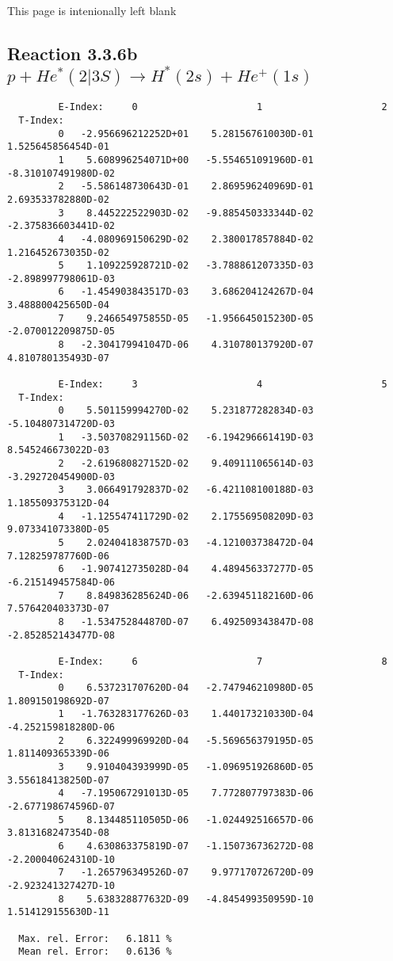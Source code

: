 \documentclass[12pt]{article}
\begin{document}
\newpage
This page is intenionally left blank
\newpage

\subsection{
Reaction 3.3.6b  $  p + He^*(2|3S) \rightarrow H^*(2s) + He^+(1s)$
}


\begin{small}\begin{verbatim}
         E-Index:     0                     1                     2
  T-Index:
         0   -2.956696212252D+01    5.281567610030D-01    1.525645856454D-01
         1    5.608996254071D+00   -5.554651091960D-01   -8.310107491980D-02
         2   -5.586148730643D-01    2.869596240969D-01    2.693533782880D-02
         3    8.445222522903D-02   -9.885450333344D-02   -2.375836603441D-02
         4   -4.080969150629D-02    2.380017857884D-02    1.216452673035D-02
         5    1.109225928721D-02   -3.788861207335D-03   -2.898997798061D-03
         6   -1.454903843517D-03    3.686204124267D-04    3.488800425650D-04
         7    9.246654975855D-05   -1.956645015230D-05   -2.070012209875D-05
         8   -2.304179941047D-06    4.310780137920D-07    4.810780135493D-07

         E-Index:     3                     4                     5
  T-Index:
         0    5.501159994270D-02    5.231877282834D-03   -5.104807314720D-03
         1   -3.503708291156D-02   -6.194296661419D-03    8.545246673022D-03
         2   -2.619680827152D-02    9.409111065614D-03   -3.292720454900D-03
         3    3.066491792837D-02   -6.421108100188D-03    1.185509375312D-04
         4   -1.125547411729D-02    2.175569508209D-03    9.073341073380D-05
         5    2.024041838757D-03   -4.121003738472D-04    7.128259787760D-06
         6   -1.907412735028D-04    4.489456337277D-05   -6.215149457584D-06
         7    8.849836285624D-06   -2.639451182160D-06    7.576420403373D-07
         8   -1.534752844870D-07    6.492509343847D-08   -2.852852143477D-08

         E-Index:     6                     7                     8
  T-Index:
         0    6.537231707620D-04   -2.747946210980D-05    1.809150198692D-07
         1   -1.763283177626D-03    1.440173210330D-04   -4.252159818280D-06
         2    6.322499969920D-04   -5.569656379195D-05    1.811409365339D-06
         3    9.910404393999D-05   -1.096951926860D-05    3.556184138250D-07
         4   -7.195067291013D-05    7.772807797383D-06   -2.677198674596D-07
         5    8.134485110505D-06   -1.024492516657D-06    3.813168247354D-08
         6    4.630863375819D-07   -1.150736736272D-08   -2.200040624310D-10
         7   -1.265796349526D-07    9.977170726720D-09   -2.923241327427D-10
         8    5.638328877632D-09   -4.845499350959D-10    1.514129155630D-11

  Max. rel. Error:   6.1811 %
  Mean rel. Error:   0.6136 %

\end{verbatim}\end{small}
\end{document}
